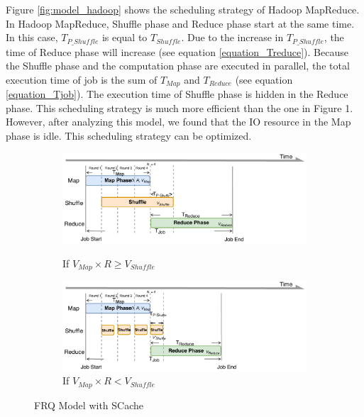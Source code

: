 {Figure \ref{fig:model_hadoop} shows the scheduling strategy of Hadoop MapReduce. In Hadoop MapReduce, Shuffle phase and Reduce phase start at the same time. In this case, \(T_{P\_Shuffle}\) is equal to \(T_{Shuffle}\). Due to the increase in \(T_{P\_Shuffle}\), the time of Reduce phase will increase (see equation \ref{equation_Treduce}). Because the Shuffle phase and the computation phase are executed in parallel, the total execution time of job is the sum of \(T_{Map}\) and \(T_{Reduce}\) (see equation \ref{equation_Tjob}). The execution time of Shuffle phase is hidden in the Reduce phase. This scheduling strategy is much more efficient than the one in Figure 1. However, after analyzing this model, we found that the IO resource in the Map phase is idle. This scheduling strategy can be optimized.

\begin{figure}
	\centering
	\begin{minipage}[hb]{\linewidth}
		\begin{subfigure}{\linewidth}
			\begin{minipage}{\linewidth}
				\includegraphics[width=\linewidth]{fig/model_scache1}
				\caption{\color{blue}If \(V_{Map} \times R \ge V_{Shuffle}\)}
				\label{fig:model_scache1}
			\end{minipage}
			\begin{minipage}{\linewidth}
				\includegraphics[width=\linewidth]{fig/model_scache2}
				\caption{\color{blue}If \(V_{Map} \times R < V_{Shuffle}\)}
				\label{fig:model_scache2}
			\end{minipage}
		\end{subfigure}
		\caption{\color{blue}FRQ Model with SCache}
		\label{fig:model_scache}
	\end{minipage}
\end{figure}

}
